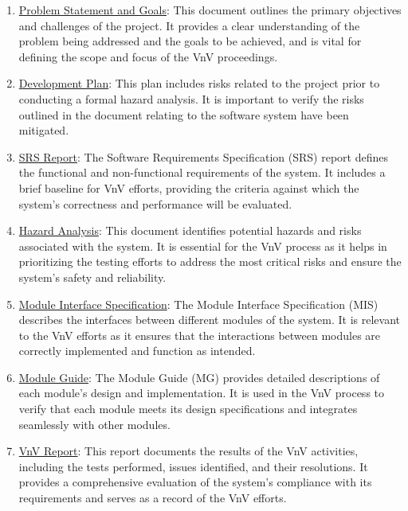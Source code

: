 \documentclass[12pt, titlepage]{article}
\begin{document}
\begin{enumerate}

  \item \href{https://github.com/takhtart/PCD/blob/main/docs/ProblemStatementAndGoals/ProblemStatement.pdf}{Problem Statement and Goals}: This document outlines the primary objectives and challenges of the project. 
  It provides a clear understanding of the problem being addressed and the goals to be achieved, and is vital for defining the scope and focus of the VnV proceedings.

  \item \href{https://github.com/takhtart/PCD/blob/main/docs/DevelopmentPlan/DevelopmentPlan.pdf}{Development Plan}: This plan includes risks related to the project prior to conducting a formal hazard analysis. 
  It is important to verify the risks outlined in the document relating to the software system have been mitigated.
  
  \item \href{https://github.com/takhtart/PCD/blob/main/docs/SRS/SRS.pdf}{SRS Report}: The Software Requirements Specification (SRS) report defines the functional and non-functional requirements of the system. 
  It includes a brief baseline for VnV efforts, providing the criteria against which the system's correctness and performance will be evaluated.
  
  \item \href{https://github.com/takhtart/PCD/blob/main/docs/HazardAnalysis/HazardAnalysis.pdf}{Hazard Analysis}: This document identifies potential hazards and risks associated with the system. 
  It is essential for the VnV process as it helps in prioritizing the testing efforts to address the most critical risks and ensure the system's safety and reliability.
  
  \item \href{https://github.com/takhtart/PCD/blob/main/docs/Design/SoftDetailedDes/MIS.pdf}{Module Interface Specification}: The Module Interface Specification (MIS) describes the interfaces between different modules of the system. 
  It is relevant to the VnV efforts as it ensures that the interactions between modules are correctly implemented and function as intended.
  
  \item \href{https://github.com/takhtart/PCD/blob/main/docs/Design/SoftArchitecture/MG.pdf}{Module Guide}: The Module Guide (MG) provides detailed descriptions of each module's design and implementation. 
  It is used in the VnV process to verify that each module meets its design specifications and integrates seamlessly with other modules.
  
  \item \href{https://github.com/takhtart/PCD/blob/main/docs/VnVReport/VnVReport.pdf}{VnV Report}: This report documents the results of the VnV activities, including the tests performed, issues identified, and their resolutions. 
  It provides a comprehensive evaluation of the system's compliance with its requirements and serves as a record of the VnV efforts.

\end{enumerate}
\end{document}
